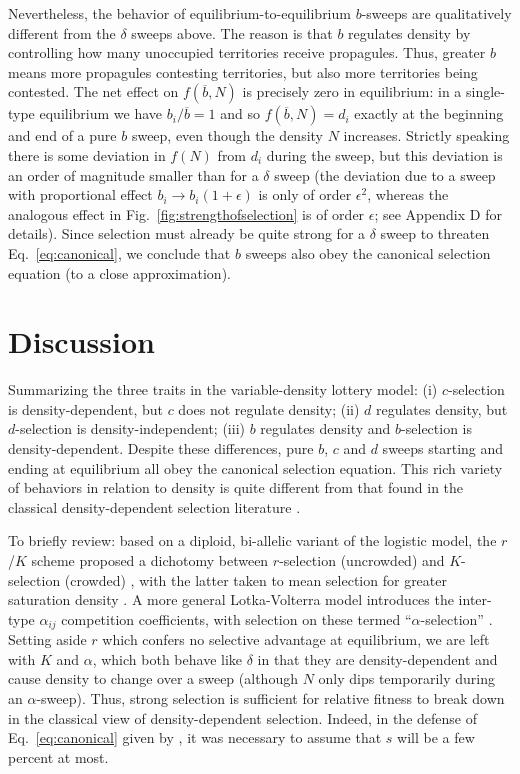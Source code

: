 \documentclass[12pt]{article}
\begin{document}
Nevertheless, the behavior of equilibrium-to-equilibrium $b$-sweeps are qualitatively different from the $\delta$ sweeps above. The reason is that $b$ regulates density by controlling how many unoccupied territories receive propagules. Thus, greater $b$ means more propagules contesting territories, but also more territories being contested. The net effect on $f(\overline{b},N)$ is precisely zero in equilibrium: in a single-type equilibrium we have $b_i/\overline{b}=1$ and so $f(\overline{b},N)=d_i$ exactly at the beginning and end of a pure $b$ sweep, even though the density $N$ increases. Strictly speaking there is some deviation in $f(N)$ from $d_i$ during the sweep, but this deviation is an order of magnitude smaller than for a $\delta$ sweep (the deviation due to a sweep with proportional effect $b_i\rightarrow b_i(1+\epsilon)$ is only of order $\epsilon^2$, whereas the analogous effect in Fig.~\ref{fig:strengthofselection} is of order $\epsilon$; see Appendix D for details). Since selection must already be quite strong for a $\delta$ sweep to threaten Eq.~\eqref{eq:canonical}, we conclude that $b$ sweeps also obey the canonical selection equation (to a close approximation). 

\section*{Discussion}

Summarizing the three traits in the variable-density lottery model: (i) $c$-selection is density-dependent, but $c$ does not regulate density; (ii) $d$ regulates density, but $d$-selection is density-independent; (iii) $b$ regulates density and $b$-selection is density-dependent. Despite these differences, pure $b$, $c$ and $d$ sweeps starting and ending at equilibrium all obey the canonical selection equation. This rich variety of behaviors in relation to density is quite different from that found in the classical density-dependent selection literature \citep{roughgarden_1979,christiansen_2004}. 

To briefly review: based on a diploid, bi-allelic variant of the logistic model, the $r$/$K$ scheme proposed a dichotomy between $r$-selection (uncrowded) and $K$-selection (crowded) \citep{macarthur_1962}, with the latter taken to mean selection for greater saturation density \citep{gill_1974}. A more general Lotka-Volterra model introduces the inter-type $\alpha_{ij}$ competition coefficients, with selection on these termed ``$\alpha$-selection'' \citep{gill_1974,joshi_2001}. Setting aside $r$ which confers no selective advantage at equilibrium, we are left with $K$ and $\alpha$, which both behave like $\delta$ in that they are density-dependent and cause density to change over a sweep (although $N$ only dips temporarily during an $\alpha$-sweep). Thus, strong selection is sufficient for relative fitness to break down in the classical view of density-dependent selection. Indeed, in the defense of Eq.~\eqref{eq:canonical} given by \cite{kimura1969natural}, it was necessary to assume that $s$ will be a few percent at most. 
\end{document}
